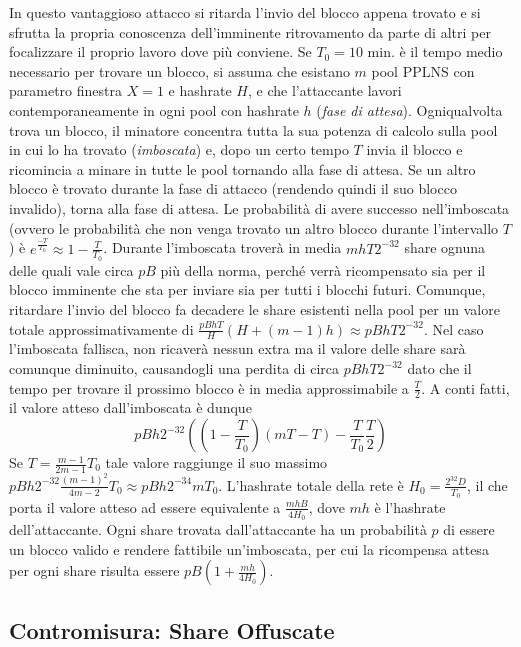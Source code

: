 In questo vantaggioso attacco si ritarda l'invio del blocco appena trovato e si sfrutta la propria conoscenza dell'imminente ritrovamento da parte di altri per focalizzare il proprio lavoro dove più conviene.
Se $T_0 = 10$ min. è il tempo medio necessario per trovare un blocco, si assuma che esistano $m$ pool PPLNS con parametro finestra $X=1$ e hashrate $H$, e che l'attaccante lavori contemporaneamente in ogni pool con hashrate $h$ (\emph{fase di attesa}). Ogniqualvolta trova un blocco, il minatore concentra tutta la sua potenza di calcolo sulla pool in cui lo ha trovato (\emph{imboscata}) e, dopo un certo tempo $T$ invia il blocco e ricomincia a minare in tutte le pool tornando alla fase di attesa. Se un altro blocco è trovato durante la fase di attacco (rendendo quindi il suo blocco invalido), torna alla fase di attesa.
Le probabilità di avere successo nell'imboscata (ovvero le probabilità che non venga trovato un altro blocco durante l'intervallo $T$) è $e^\frac{-T}{T_0} \approx 1 - \frac{T}{T_0}$. Durante l'imboscata troverà in media $mhT2^{-32}$ share ognuna delle quali vale circa $pB$ più della norma, perché verrà ricompensato sia per il blocco imminente che sta per inviare sia per tutti i blocchi futuri. Comunque, ritardare l'invio del blocco fa decadere le share esistenti nella pool per un valore totale approssimativamente di $\frac{pBhT}{H}(H + (m-1)h) \approx pBhT2^{-32}$. Nel caso l'imboscata fallisca, non ricaverà nessun extra ma il valore delle share sarà comunque diminuito, causandogli una perdita di circa $pBhT2^{-32}$ dato che il tempo per trovare il prossimo blocco è in media approssimabile a $\frac{T}{2}$.
A conti fatti, il valore atteso dall'imboscata è dunque
\[pBh2^{-32}\left(\left(1-\frac{T}{T_0}\right)\left(mT-T\right) - \frac{T}{T_0}\frac{T}{2}\right)\]
Se $T=\frac{m-1}{2m-1}T_0$ tale valore raggiunge il suo massimo $pBh2^{-32}\frac{(m-1)^2}{4m-2}T_0 \approx pBh2^{-34}mT_0$. L'hashrate totale della rete è $H_0=\frac{2^{32}D}{T_0}$, il che porta il valore atteso ad essere equivalente a $\frac{mhB}{4H_0}$, dove $mh$ è l'hashrate dell'attaccante.
Ogni share trovata dall'attaccante ha un probabilità $p$ di essere un blocco valido e rendere fattibile un'imboscata, per cui la ricompensa attesa per ogni share risulta essere $pB\left(1 + \frac{mh}{4H_0}\right)$.

\subsection{Contromisura: Share Offuscate}

